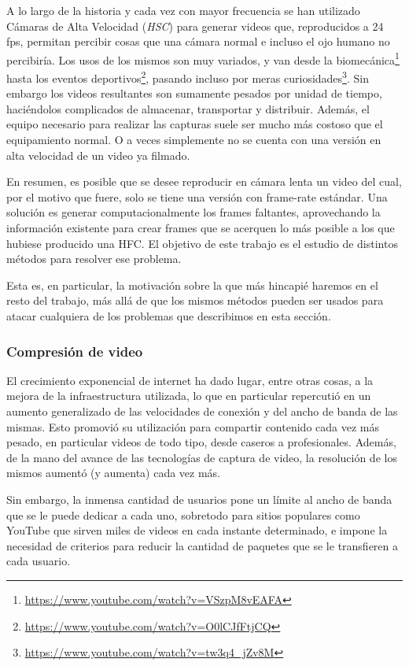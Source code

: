 A lo largo de la historia y cada vez con mayor frecuencia se han utilizado Cámaras de Alta Velocidad (\emph{HSC}) para generar videos que, reproducidos a 24 fps, permitan percibir cosas que una cámara normal e incluso el ojo humano no percibiría. Los usos de los mismos son muy variados, y van desde la biomecánica\footnote{\url{https://www.youtube.com/watch?v=VSzpM8vEAFA}} hasta los eventos deportivos\footnote{\url{https://www.youtube.com/watch?v=O0lCJfFtjCQ}}, pasando incluso por meras curiosidades\footnote{\url{https://www.youtube.com/watch?v=tw3q4_jZv8M}}. Sin embargo los videos resultantes son sumamente pesados por unidad de tiempo, haciéndolos complicados de almacenar, transportar y distribuir. Además, el equipo necesario para realizar las capturas suele ser mucho más costoso que el equipamiento normal. O a veces simplemente no se cuenta con una versión en alta velocidad de un video ya filmado.

En resumen, es posible que se desee reproducir en cámara lenta un video del cual, por el motivo que fuere, solo se tiene una versión con frame-rate estándar. Una solución es generar computacionalmente los frames faltantes, aprovechando la información existente para crear frames que se acerquen lo más posible a los que hubiese producido una HFC. El objetivo de este trabajo es el estudio de distintos métodos para resolver ese problema.

Esta es, en particular, la motivación sobre la que más hincapié haremos en el resto del trabajo, más allá de que los mismos métodos pueden ser usados para atacar cualquiera de los problemas que describimos en esta sección.

\subsubsection{Compresión de video}
El crecimiento exponencial de internet ha dado lugar, entre otras cosas\cite{TP2}, a la mejora de la infraestructura utilizada, lo que en particular repercutió en un aumento generalizado de las velocidades de conexión y del ancho de banda de las mismas. Esto promovió su utilización para compartir contenido cada vez más pesado, en particular videos de todo tipo, desde caseros a profesionales. Además, de la mano del avance de las tecnologías de captura de video, la resolución de los mismos aumentó (y aumenta) cada vez más.

Sin embargo, la inmensa cantidad de usuarios pone un límite al ancho de banda que se le puede dedicar a cada uno, sobretodo para sitios populares como YouTube que sirven miles de videos en cada instante determinado, e impone la necesidad de criterios para reducir la cantidad de paquetes que se le transfieren a cada usuario.

